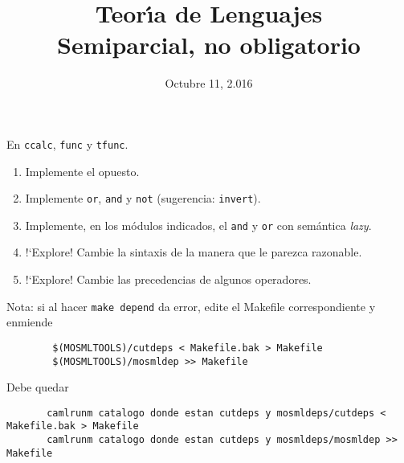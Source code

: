 \documentclass{article}
\title{Teor\'{\i}a de Lenguajes \\ Semiparcial, no obligatorio}
\date{Octubre 11, 2.016}
\author{}
\begin{document}
\maketitle
En {\tt ccalc}, {\tt func} y {\tt tfunc}.

\begin{enumerate}
\item Implemente el opuesto.
\item Implemente {\tt or}, {\tt and} y {\tt not} (sugerencia: {\tt invert}).
\item Implemente, en los m\'odulos indicados, el {\tt and} y
	{\tt or} con sem\'antica {\it lazy}.
\item !`Explore! Cambie la sintaxis de la manera que le parezca razonable.
\item !`Explore! Cambie las precedencias de algunos operadores.
\end{enumerate}

Nota: si al hacer {\tt make depend} da error, edite el Makefile correspondiente
y enmiende

\begin{verbatim}
        $(MOSMLTOOLS)/cutdeps < Makefile.bak > Makefile
        $(MOSMLTOOLS)/mosmldep >> Makefile
\end{verbatim}

Debe quedar

\begin{verbatim}
       camlrunm catalogo donde estan cutdeps y mosmldeps/cutdeps < Makefile.bak > Makefile
       camlrunm catalogo donde estan cutdeps y mosmldeps/mosmldep >> Makefile
\end{verbatim}
\end{document}
